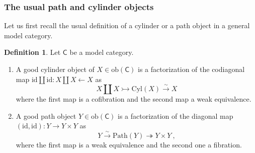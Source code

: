 \documentclass{proc-l}
\theoremstyle{plain}
\theoremstyle{definition}
\newtheorem{definition}[{theorem}]{Definition}
\theoremstyle{remark}
\begin{document}
\subsubsection{The usual path and cylinder objects}%
\label{Section:A.4.1} Let us first recall the usual definition of a cylinder or a path object in a general model category.

\begin{definition}%
\label{Definition:A.12}Let $\mathsf{C}$ be a model category.
\begin{enumerate}[label=(\arabic*),start=1]
\item A good cylinder object of $X \in \mathrm{ob}(\mathsf{C})$ is a factorization of the codiagonal map $\mathrm{id} \amalg \mathrm{id}: X \amalg X \longleftarrow X$ as
\[
X \amalg X\rightarrowtail \mathrm{Cyl}(X)\stackrel{\sim}{\rightarrow} X
\]
where the first map is a cofibration and the second map a weak equivalence.

\item A good path object $Y\in \mathrm{ob}(\mathsf{C})$ is a factorization of the diagonal map $(\mathrm{id},\mathrm{id}): Y \longrightarrow Y \times Y$ as
\[
Y\stackrel{\sim}{\rightarrow}\mathrm{Path}(Y)\twoheadrightarrow Y\times Y~,
\]
where the first map is a weak equivalence and the second one a fibration.
\end{enumerate}
\end{definition}
\end{document}
